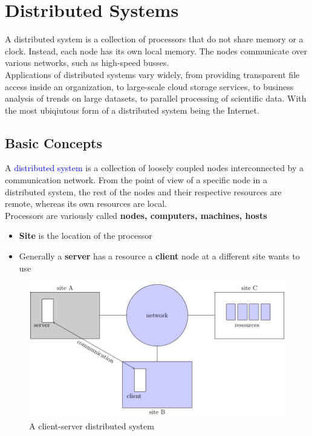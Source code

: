 \documentclass[oneside]{book}
\begin{document}
    \chapter{Distributed Systems}
        A distributed system is a collection of processors that do not share memory or
        a clock. Instead, each node has its own local memory. The nodes communicate over 
        various networks, such as high-speed busses.\\
        Applications of distributed systems vary widely, from providing transparent file access
        inside an organization, to large-scale cloud storage services, to business analysis of 
        trends on large datasets, to parallel processing of scientific data. With the most 
        ubiqiutous form of a distributed system being the Internet.
        \section{Basic Concepts}
            A \textcolor{blue}{distributed system} is a collection of loosely coupled nodes
            interconnected by a communication network. From the point of view of a specific node
            in a distributed system, the rest of the nodes and their respective resources are remote,
            whereas its own resources are local.\\
            Processors are variously called \textbf{nodes, computers, machines, hosts}\\
            \begin{itemize}
                \item \textbf{Site} is the location of the processor
                \item Generally a \textbf{server} has a resource a \textbf{client} node at a different
                site wants to use
            \end{itemize}
            \begin{figure}[H]
                \centering
                \includegraphics{figures/client_server.pdf}
                \caption{A client-server distributed system}
            \end{figure}
\end{document}
